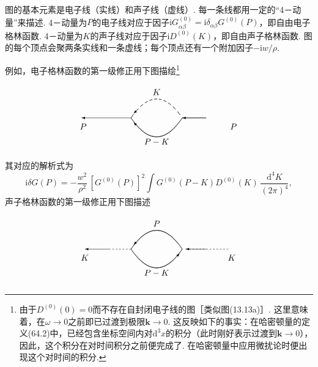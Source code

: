 图的基本元素是电子线（实线）和声子线（虚线）. 每一条线都用一定的“4－动量”来描述. 4－动量为$P$的电子线对应于因子$\mathrm{i}G^{(0)}_{\alpha\beta}=\mathrm{i}\delta_{\alpha\beta}G^{(0)}(P)$，即自由电子格林函数. 4－动量为$K$的声子线对应于因子$\mathrm{i}D^{(0)}(K)$，即自由声子格林函数. 图的每个顶点会聚两条实线和一条虚线；每个顶点还有一个附加因子$-\mathrm{i}w/\rho$.

例如，电子格林函数的第一级修正用下图描绘\footnote{由于$D^{(0)}(0)=0$而不存在自封闭电子线的图［类似图(13.13a)］. 这里意味着，在$\omega\to0$之前即已过渡到极限$\bm k\to0$. 这反映如下的事实：在哈密顿量的定义(64.2)中，已经包含坐标空间内对$\mathrm d^3x$的积分（此时刚好表示过渡到$\bm k\to0$），因此，这个积分在对时间积分之前便完成了. 在哈密顿量中应用微扰论时便出现这个对时间的积分.}
\begin{equation}
\setlength{\unitlength}{1pt}%
\begin{picture}(205,80)(0,2)
  \put(70,40){\line(-1,0){28}}
  \put(42,40){\vector(-1,0){30}}
  \put(14,30){\makebox(0,0){$P$}}
  \put(130,40){\line(1,0){28}}
  \put(158,40){\vector(-1,0){28}}
  \put(190,30){\makebox(0,0){$P$}}
  \qbezier(70.0,40.0)(71.5,42.2)(73.0,44.2)
  \qbezier(75.5,47.3)(77.0,49.1)(78.5,50.7)
  \qbezier(80.9,53.1)(82.4,54.5)(83.9,55.7)
  \qbezier(86.4,57.5)(87.9,58.5)(89.4,59.2)
  \qbezier(91.8,60.4)(93.3,61.0)(94.8,61.3)
  \qbezier(97.3,61.8)(98.8,62.0)(100.3,62.0)
  \qbezier(102.7,61.8)(104.2,61.6)(105.7,61.2)
  \qbezier(108.2,60.4)(109.7,59.8)(111.2,58.9)
  \qbezier(113.6,57.5)(115.1,56.5)(116.6,55.2)
  \qbezier(119.1,53.1)(120.6,51.7)(122.1,50.1)
  \qbezier(124.5,47.3)(126.0,45.5)(127.5,43.5)
  \put(82.0,54.1){\vector(-1,-1){9}}
  \put(100,70){\makebox(0,0){$K$}}
  \qbezier(70,40)(100,-4)(130,40)
  \put(82.0,25.9){\vector(-1,1){9}}
  \put(100,12){\makebox(0,0){$P-K$}}
\end{picture}
\end{equation}
其对应的解析式为
\begin{equation}
\mathrm{i}\delta G(P)=-\frac{w^2}{\rho^2}\,[G^{(0)}(P)]^2
\int G^{(0)}(P-K)D^{(0)}(K)\,\frac{\mathrm{d}^4K}{(2\pi)^4},
\end{equation}
声子格林函数的第一级修正用下图描述
\begin{equation}
\setlength{\unitlength}{1pt}%
\begin{picture}(205,80)(0,2)
  \multiput(48,40)(4,0){6}{\line(1,0){2}}
  \put(46,40){\vector(-1,0){30}}
  \put(16,30){\makebox(0,0){$K$}}
  \multiput(134,40)(4,0){6}{\line(1,0){2}}
  \multiput(162,40)(4,0){6}{\line(1,0){2}}
  \put(160,40){\vector(-1,0){26}}
  \put(188,30){\makebox(0,0){$K$}}
  \qbezier(70,40)(100,84)(130,40)
  \put(82.0,54.1){\vector(-1,-1){9}}
  \put(100,70){\makebox(0,0){$P$}}
  \qbezier(70,40)(100,-4)(130,40)
  \put(118.0,25.9){\vector(1,1){9}}
  \put(100,12){\makebox(0,0){$P-K$}}
\end{picture}
\end{equation}

